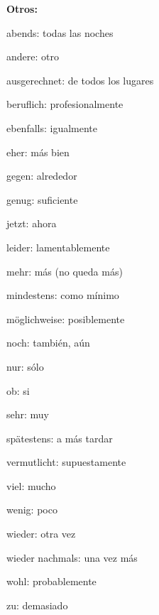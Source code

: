 \textbf{Otros:}
\begin{multicols}{3}
\begin{myitemize}
\item abends: todas las noches
\item andere: otro
\item ausgerechnet: de todos los lugares
\item beruflich: profesionalmente
\item ebenfalls: igualmente
\item eher: más bien
\item gegen: alrededor
\item genug: suficiente
\item jetzt: ahora
\item leider: lamentablemente
\item mehr: más (no queda más)
\item mindestens: como mínimo
\item möglichweise: posiblemente
\item noch: también, aún
\item nur: sólo
\item ob: si
\item sehr: muy
\item spätestens: a más tardar
\item vermutlicht: supuestamente
\item viel: mucho
\item wenig: poco
\item wieder: otra vez
\item wieder nachmals: una vez más
\item wohl: probablemente
\item zu: demasiado
\end{myitemize}
\end{multicols}


